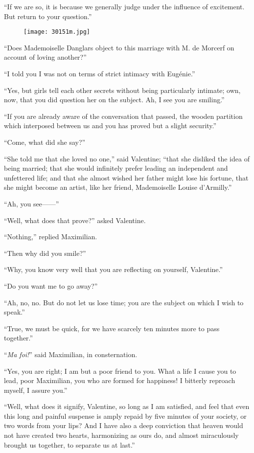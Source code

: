 “If we are so, it is because we generally judge under the influence of
excitement. But return to your question.”

\begin{figure}[ht]
\texttt{[image: 30151m.jpg]}
\end{figure}

“Does Mademoiselle Danglars object to this marriage with M. de Morcerf
on account of loving another?”

“I told you I was not on terms of strict intimacy with Eugénie.”

“Yes, but girls tell each other secrets without being particularly
intimate; own, now, that you did question her on the subject. Ah, I see
you are smiling.”

“If you are already aware of the conversation that passed, the wooden
partition which interposed between us and you has proved but a slight
security.”

“Come, what did she say?”

“She told me that she loved no one,” said Valentine; “that she disliked
the idea of being married; that she would infinitely prefer leading an
independent and unfettered life; and that she almost wished her father
might lose his fortune, that she might become an artist, like her
friend, Mademoiselle Louise d’Armilly.”

“Ah, you see——”

“Well, what does that prove?” asked Valentine.

“Nothing,” replied Maximilian.

“Then why did you smile?”

“Why, you know very well that you are reflecting on yourself,
Valentine.”

“Do you want me to go away?”

“Ah, no, no. But do not let us lose time; you are the subject on which
I wish to speak.”

“True, we must be quick, for we have scarcely ten minutes more to pass
together.”

“\textit{Ma foi!}” said Maximilian, in consternation.

“Yes, you are right; I am but a poor friend to you. What a life I cause
you to lead, poor Maximilian, you who are formed for happiness! I
bitterly reproach myself, I assure you.”

“Well, what does it signify, Valentine, so long as I am satisfied, and
feel that even this long and painful suspense is amply repaid by five
minutes of your society, or two words from your lips? And I have also a
deep conviction that heaven would not have created two hearts,
harmonizing as ours do, and almost miraculously brought us together, to
separate us at last.”


